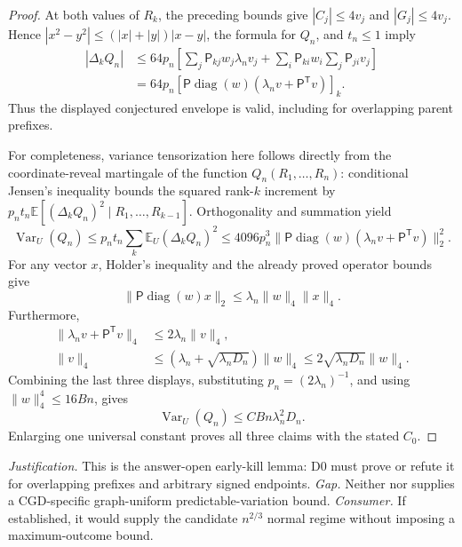 \documentclass{article}
\begin{document}
\begin{proof}
At both values of \(R_k\), the preceding bounds give \(|C_j|\le4v_j\) and \(|G_j|\le4v_j\).  Hence \(|x^2-y^2|\le(|x|+|y|)|x-y|\), the formula for \(Q_n\), and \(t_n\le1\) imply
\[
 \begin{aligned}
 |\Delta_kQ_n|
 &\le64p_n\left[\sum_j\mathsf P_{kj}w_j\lambda_nv_j
  +\sum_i\mathsf P_{ki}w_i\sum_j\mathsf P_{ji}v_j\right]\\
 &=64p_n[\mathsf P\operatorname{diag}(w)
       (\lambda_nv+\mathsf P^{\mathsf T}v)]_k.
 \end{aligned}
\]
Thus the displayed conjectured envelope is valid, including for overlapping parent prefixes.

For completeness, variance tensorization here follows directly from the coordinate-reveal martingale of the function \(Q_n(R_1,\ldots,R_n)\): conditional Jensen's inequality bounds the squared rank-\(k\) increment by \(p_nt_n\mathbb E[(\Delta_kQ_n)^2\mid R_1,\ldots,R_{k-1}]\).  Orthogonality and summation yield
\[
 \operatorname{Var}_U(Q_n)\le p_nt_n\sum_k\mathbb E_U(\Delta_kQ_n)^2
 \le4096p_n^3\|\mathsf P\operatorname{diag}(w)
 (\lambda_nv+\mathsf P^{\mathsf T}v)\|_2^2.
\]
For any vector \(x\), Holder's inequality and the already proved operator bounds give
\[
 \|\mathsf P\operatorname{diag}(w)x\|_2
 \le\lambda_n\|w\|_4\|x\|_4.
\]
Furthermore,
\[
 \begin{aligned}
 \|\lambda_nv+\mathsf P^{\mathsf T}v\|_4&\le2\lambda_n\|v\|_4,\\
 \|v\|_4&\le(\lambda_n+\sqrt{\lambda_nD_n})\|w\|_4
 \le2\sqrt{\lambda_nD_n}\|w\|_4.
 \end{aligned}
\]
Combining the last three displays, substituting \(p_n=(2\lambda_n)^{-1}\), and using \(\|w\|_4^4\le16Bn\), gives
\[
 \operatorname{Var}_U(Q_n)\le C Bn\lambda_n^2D_n.
\]
Enlarging one universal constant proves all three claims with the stated \(C_0\).
\end{proof}
\par\smallskip\noindent \textit{Justification.} This is the answer-open early-kill lemma: D0 must prove or refute it for overlapping prefixes and arbitrary signed endpoints. \textit{Gap.} Neither \cite{Haeusler1988MartingaleRate} nor \cite{KandirosPipisDaskalakisHarshaw2024CGD} supplies a CGD-specific graph-uniform predictable-variation bound. \textit{Consumer.} If established, it would supply the candidate \(n^{2/3}\) normal regime without imposing a maximum-outcome bound.
\end{document}
